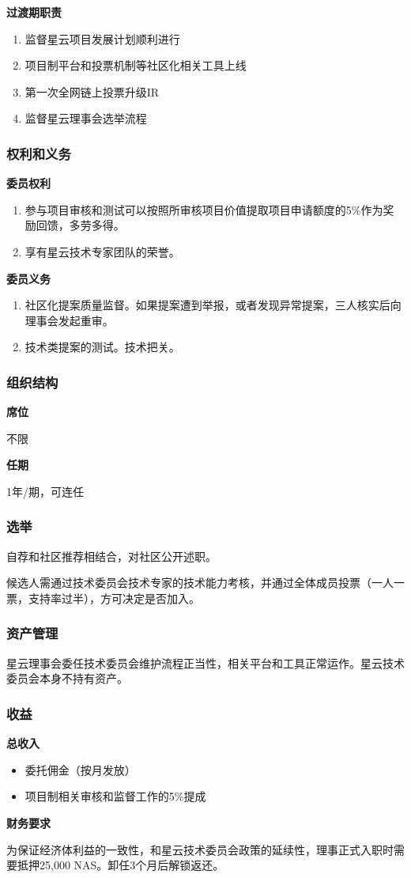 \textbf{过渡期职责}
\begin{enumerate}
	\item 监督星云项目发展计划顺利进行
	\item 项目制平台和投票机制等社区化相关工具上线
	\item 第一次全网链上投票升级IR
	\item 监督星云理事会选举流程
\end{enumerate}

\subsubsection{权利和义务}
\textbf{委员权利}
\begin{enumerate}
	\item 参与项目审核和测试可以按照所审核项目价值提取项目申请额度的5\%作为奖励回馈，多劳多得。
	\item 享有星云技术专家团队的荣誉。
\end{enumerate}

\textbf{委员义务}

\begin{enumerate}
	\item 社区化提案质量监督。如果提案遭到举报，或者发现异常提案，三人核实后向理事会发起重审。
	\item 技术类提案的测试。技术把关。
\end{enumerate}

\subsubsection{组织结构}
\textbf{席位}

不限
\vskip 10pt

\textbf{任期}

1年/期，可连任

\subsubsection{选举}
自荐和社区推荐相结合，对社区公开述职。

候选人需通过技术委员会技术专家的技术能力考核，并通过全体成员投票（一人一票，支持率过半），方可决定是否加入。

\subsubsection{资产管理}
星云理事会委任技术委员会维护流程正当性，相关平台和工具正常运作。星云技术委员会本身不持有资产。

\subsubsection{收益}
\textbf{总收入}
\begin{itemize}
	\item 委托佣金（按月发放）
	\item 项目制相关审核和监督工作的5\%提成
\end{itemize}

\textbf{财务要求}

为保证经济体利益的一致性，和星云技术委员会政策的延续性，理事正式入职时需要抵押25,000 NAS。卸任3个月后解锁返还。

